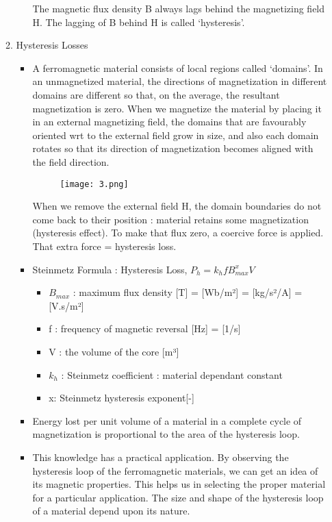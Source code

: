 \begin{enumerate}
\begin{enumerate}
\begin{enumerate}
            The magnetic flux density B always lags behind the magnetizing field H. The lagging of B behind H is called ‘hysteresis’.
        \end{enumerate}
        \item Hysteresis Losses
        \begin{itemize}
            \item A ferromagnetic material consists of local regions called ‘domains’. In an unmagnetized material, the directions of magnetization in different domains are different so that, on the average, the resultant magnetization is zero.  When we magnetize the material by placing it in an external magnetizing field, the domains that are favourably oriented wrt to the external field grow in size, and also each domain rotates so that its direction of magnetization becomes aligned with the field direction. 
            \begin{figure}[H]
                \centering
                \texttt{[image: 3.png]}
                \caption{}
            \end{figure}
            When we remove the external field H, the domain boundaries do not come back to their  position : material retains some magnetization (hysteresis effect). To make that flux zero, a coercive force is applied. That extra force = hysteresis loss.
            \item 	Steinmetz Formula : Hysteresis Loss, $P_h= k_hf B_{max}^x V$
            \begin{itemize}
                \item 	$B_{max}$ : maximum flux density [T] = [Wb/m²] = [kg/s²/A] = [V.s/m²]
                \item 	f : frequency of magnetic reversal [Hz]  = [1/s]
                \item 	V : the volume of the core [m³]
                \item 	$k_h$ : Steinmetz coefficient : material dependant constant 
                \item 	x: Steinmetz hysteresis exponent[-]
            \end{itemize}
            \item 	Energy lost per unit volume of a material in a complete cycle of magnetization is proportional to the area of the hysteresis loop.
            \item 	This knowledge has a practical application. By observing the hysteresis loop of the ferromagnetic materials, we can get an idea of its magnetic properties. This helps us in selecting the proper material for a particular application. The size and shape of the hysteresis loop of a material depend upon its nature.


\end{itemize}
\end{enumerate}
\end{enumerate}
